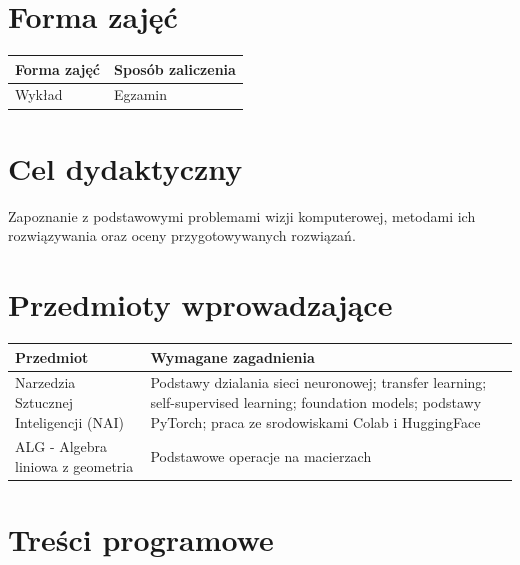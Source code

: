 \documentclass[12pt, a4paper]{article}
\begin{document}
\section{Forma zajęć}

\begin{tabular}{ll}
  \hline
  \textbf{Forma zajęć} & \textbf{Sposób zaliczenia} \\
  \hline
  Wykład & Egzamin \\
  \hline
\end{tabular}

\section{Cel dydaktyczny}

Zapoznanie z podstawowymi problemami wizji komputerowej, metodami ich rozwiązywania oraz oceny przygotowywanych rozwiązań.

\section{Przedmioty wprowadzające}

\begin{tabularx}{\textwidth}{lX}
  \hline
  \textbf{Przedmiot} & \textbf{Wymagane zagadnienia} \\
  \hline
  Narzedzia Sztucznej Inteligencji (NAI) & Podstawy dzialania sieci neuronowej; transfer learning; self-supervised learning; foundation models; podstawy PyTorch; praca ze srodowiskami Colab i HuggingFace \\
  ALG - Algebra liniowa z geometria & Podstawowe operacje na macierzach \\
  \hline
\end{tabularx}

\section{Treści programowe}
\end{document}
